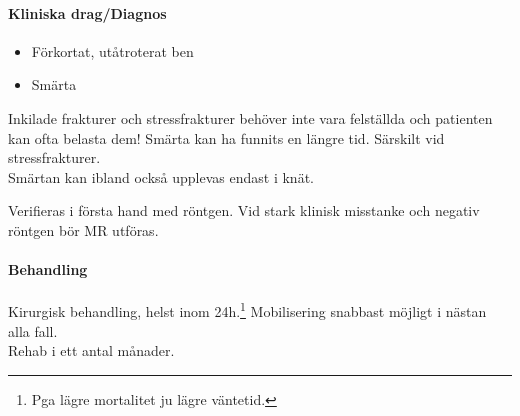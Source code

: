\documentclass[
  letterpaper,
  DIV=11,
  numbers=noendperiod]{scrreport}
\let\oldparagraph\paragraph
\renewcommand{\paragraph}[1]{\oldparagraph{#1}\mbox{}}
\providecommand{\tightlist}{%
  \setlength{\itemsep}{0pt}\setlength{\parskip}{0pt}}\usepackage{longtable,booktabs,array}
\begin{document}
\hypertarget{kliniska-dragdiagnos-10}{%
\paragraph{Kliniska drag/Diagnos}\label{kliniska-dragdiagnos-10}}

\begin{itemize}
\tightlist
\item
  Förkortat, utåtroterat ben
\item
  Smärta
\end{itemize}

\begin{tcolorbox}[enhanced jigsaw, colback=white, colbacktitle=quarto-callout-warning-color!10!white, toptitle=1mm, arc=.35mm, toprule=.15mm, rightrule=.15mm, titlerule=0mm, breakable, bottomrule=.15mm, colframe=quarto-callout-warning-color-frame, left=2mm, opacityback=0, coltitle=black, title=\textcolor{quarto-callout-warning-color}{\faExclamationTriangle}\hspace{0.5em}{Missas ibland}, leftrule=.75mm, bottomtitle=1mm, opacitybacktitle=0.6]

Inkilade frakturer och stressfrakturer behöver inte vara felställda och
patienten kan ofta belasta dem! Smärta kan ha funnits en längre tid.
Särskilt vid stressfrakturer.\\
Smärtan kan ibland också upplevas endast i knät.\footnotemark{}

\end{tcolorbox}


Verifieras i första hand med röntgen. Vid stark klinisk misstanke och
negativ röntgen bör MR utföras.

\hypertarget{behandling-12}{%
\paragraph{Behandling}\label{behandling-12}}

Kirurgisk behandling, helst inom 24h.\footnote{Pga lägre mortalitet ju
  lägre väntetid.} Mobilisering snabbast möjligt i nästan alla fall.\\
Rehab i ett antal månader.
\end{document}
